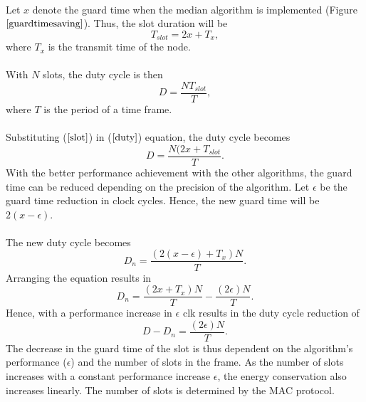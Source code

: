 \documentclass[a4paper,10pt]{report}
\begin{document}
\paragraph*{}
Let $x$ denote the guard time when the median algorithm is implemented (Figure $\ref{guardtimesaving}$). Thus, the slot
duration will be
\begin{equation}
T_{slot}=2x + T_x ,
\label{slot}
\end{equation}
where $T_x$ is the transmit time of the node.
\paragraph*{}
With $N$ slots, the duty cycle is then
\begin{equation}
D = \frac{NT_{slot}}{T}, \label{duty}
\end{equation}
where $T$ is the period of a time frame. \paragraph*{} Substituting ($\ref{slot}$) in ($\ref{duty}$) equation, the duty cycle becomes
\begin{equation}
D= \frac{N(2x+T_{slot}}{T}.
\end{equation}
With the better performance achievement with the other algorithms, the guard time can be reduced depending on the precision of the
algorithm. Let $\epsilon$ be the guard time reduction in clock cycles. Hence, the new guard time will be $2(x-\epsilon)$.
\paragraph*{} The new duty cycle becomes
\begin{equation}
D_n=\frac{(2(x-\epsilon)+T_x)N}{T}.
\end{equation}
Arranging the equation results in
\begin{equation}
D_n= \frac{(2x+T_x)N}{T} - \frac{(2\epsilon)N}{T}.
\end{equation}
Hence, with a performance increase in $\epsilon$ clk results in the duty cycle reduction of
\begin{equation}
D - D_n = \frac{(2\epsilon)N}{T}.
\end{equation}
The decrease in the guard time of the slot is thus dependent on the algorithm's performance ($\epsilon$) and the number of slots in the
frame. As the number of slots increases with a constant performance increase $\epsilon$, the energy conservation also increases linearly. The number of slots is determined by the MAC protocol.
\end{document}
